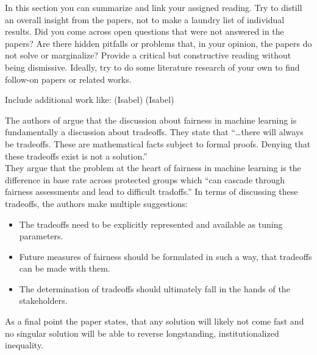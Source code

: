 In this section you can summarize and link your assigned reading. Try to distill an overall insight 
from the papers, not to make a laundry list of individual results. Did you come across open questions 
that were not answered in the papers? Are there hidden pitfalls or problems that, in your opinion, the 
papers do not solve or marginalize? Provide a critical but constructive reading without being dismissive. 
Ideally, try to do some literature research of your own to find follow-on papers or related works. 

Include additional work like: \cite{DBLP:conf/www/ZafarVGG17} (Isabel) \cite{JMLR:v20:18-262} (Isabel) \cite{automatedDsicrimination} \cite{Singh} \cite{DBLP:conf/maics/RalescuR17}

The authors of \cite{Berk.2018} argue that the discussion about fairness in machine learning 
is fundamentally a discussion about tradeoffs. They state that \enquote{\dots there will 
always be tradeoffs. These are mathematical facts subject to formal proofs. Denying that these
tradeoffs exist is not a solution.} \\
They argue that the problem at the heart of fairness in machine learning is the difference
in base rate across protected groups which \enquote{can cascade through fairness assessments
and lead to difficult tradoffs.} In terms of discussing these tradeoffs, the authors make multiple
suggestions:
\begin{itemize}
    \item The tradeoffs need to be explicitly represented and available as tuning parameters.
    \item Future measures of fairness should be formulated in such a way, that tradeoffs can
    be made with them.
    \item The determination of tradeoffs should ultimately fall in the hands of the stakeholders.
\end{itemize}
As a final point the paper states, that any solution will likely not come fast and no singular
solution will be able to reverse longstanding, institutionalized inequality.